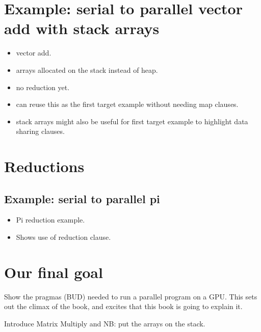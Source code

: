 \section{Example: serial to parallel vector add with stack arrays}
\begin{itemize}
  \item vector add.
  \item arrays allocated on the stack instead of heap.
  \item no reduction yet.
  \item can reuse this as the first target example without needing map clauses.
  \item stack arrays might also be useful for first target example to highlight data sharing clauses.
\end{itemize}

\section{Reductions}
\label{sec:reduction}
\subsection{Example: serial to parallel pi}
\begin{itemize}
  \item Pi reduction example.
  \item Shows use of reduction clause.
\end{itemize}

\section{Our final goal}
Show the pragmas (BUD) needed to run a parallel program on a GPU.
This sets out the climax of the book, and excites that this book is going to explain it.


Introduce Matrix Multiply and
NB: put the arrays on the stack.



